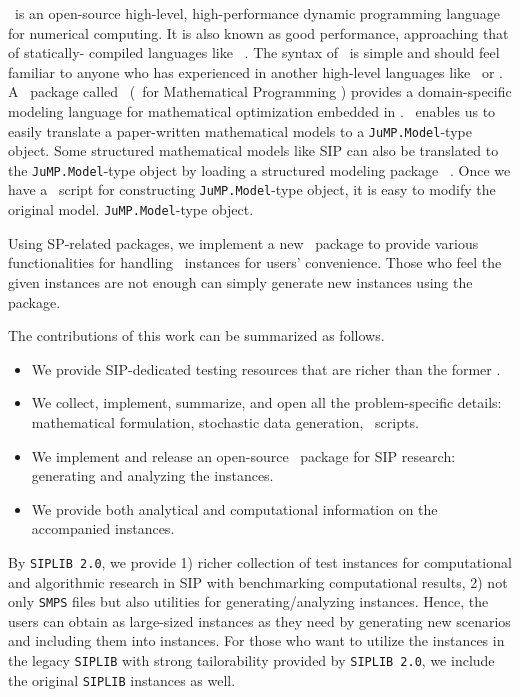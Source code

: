 \julia\ is an open-source high-level, high-performance dynamic programming language for 
numerical computing. It is also known as good performance, approaching that of statically-
compiled languages like \clang\ \cite{journal:BEKS2017}. The syntax of \julia\ is simple and 
should feel familiar to anyone who has experienced in another high-level languages like 
\matlab\ or \python. A \julia\ package called \jump\ (\julia\ for Mathematical Programming 
\cite{journal:JuMP}) provides a domain-specific modeling language for mathematical 
optimization embedded in \julia. \jump\ enables us to easily translate a paper-written 
mathematical models to a \texttt{JuMP.Model}-type object. Some structured mathematical models 
like SIP can also be translated to the \texttt{JuMP.Model}-type object by loading a 
structured modeling package \structjump\ \cite{web:StructJuMP}. Once we have a \julia\ script 
for constructing \texttt{JuMP.Model}-type object, it is easy to modify the original model. 
\texttt{JuMP.Model}-type object. 

Using SP-related packages, we implement a new \julia\ package to provide various 
functionalities for handling \siplibtwo\ instances for users' convenience. Those who feel the 
given instances are not enough can simply generate new instances using the package.


The contributions of this work can be summarized as follows.
\begin{itemize}
	\item We provide SIP-dedicated testing resources that are richer than the former \siplib.
	\item We collect, implement, summarize, and open all the problem-specific details: 
	mathematical formulation, stochastic data generation, \julia\ scripts.
	\item We implement and release an open-source \julia\ package for SIP research: 
	generating and analyzing the instances.
	\item We provide both analytical and computational information on the accompanied 
	instances.
\end{itemize}

By \texttt{SIPLIB 2.0}, we provide 1) richer collection of test instances for computational 
and algorithmic research in SIP with benchmarking computational results, 2) not only 
\texttt{SMPS} files but also utilities for generating/analyzing instances. Hence, the users 
can obtain as large-sized instances as they need by generating new scenarios and including 
them into instances. For those who want to utilize the instances in the legacy 
\texttt{SIPLIB} with strong tailorability provided by \texttt{SIPLIB 2.0}, we include the 
original \texttt{SIPLIB} instances as well.

